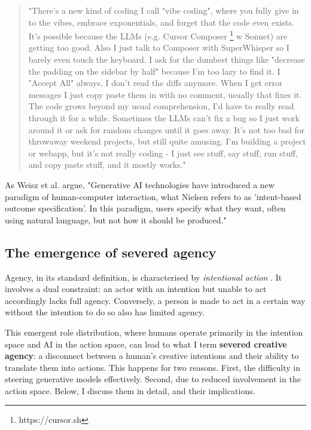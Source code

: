 \begin{quote}
"There's a new kind of coding I call "vibe coding", where you fully give in to the vibes, embrace exponentials, and forget that the code even exists. It's possible because the LLMs (e.g. Cursor Composer \footnote{https://cursor.sh} w Sonnet) are getting too good. Also I just talk to Composer with SuperWhisper so I barely even touch the keyboard. I ask for the dumbest things like "decrease the padding on the sidebar by half" because I'm too lazy to find it. I "Accept All" always, I don't read the diffs anymore. When I get error messages I just copy paste them in with no comment, usually that fixes it. The code grows beyond my usual comprehension, I'd have to really read through it for a while. Sometimes the LLMs can't fix a bug so I just work around it or ask for random changes until it goes away. It's not too bad for throwaway weekend projects, but still quite amusing. I'm building a project or webapp, but it's not really coding - I just see stuff, say stuff, run stuff, and copy paste stuff, and it mostly works." \cite{Karpathy2025-uu}
\end{quote}

As Weisz et al. \cite{Weisz2024-io} argue, "Generative AI technologies have introduced a new paradigm of human-computer interaction, what Nielsen refers to as 'intent-based outcome specification'. In this paradigm, users specify what they want, often using natural language, but not how it should be produced."

\subsection{The emergence of severed agency}

Agency, in its standard definition, is characterised by \textit{intentional action} \cite{Schlosser2019-jk}. It involves a dual constraint: an actor with an intention but unable to act accordingly lacks full agency. Conversely, a person is made to act in a certain way without the intention to do so also has limited agency. 

This emergent role distribution, where humans operate primarily in the intention space and AI in the action space, can lead to what I term \textbf{severed creative agency}: a disconnect between a human's creative intentions and their ability to translate them into actions. This happens for two reasons. First, the difficulty in steering generative models effectively. Second, due to reduced involvement in the action space. Below, I discuss them in detail, and their implications. 


